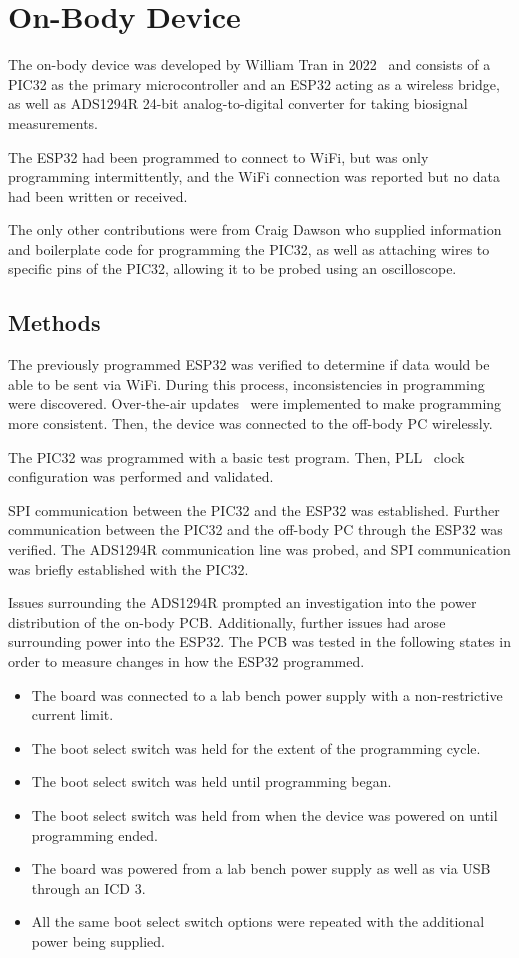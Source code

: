 \chapter{On-Body Device}
The on-body device was developed by William Tran in 2022~\cite{Tran:2022} and consists of
a PIC32 as the primary microcontroller and an ESP32 acting as a wireless bridge,
as well as ADS1294R 24-bit analog-to-digital converter for taking biosignal measurements.

The ESP32 had been programmed to connect to WiFi, but was only programming intermittently,
and the WiFi connection was reported but no data had been written or received.

The only other contributions were from Craig Dawson who supplied information and boilerplate code for programming the PIC32,
as well as attaching wires to specific pins of the PIC32, allowing it to be probed using an oscilloscope.


\section{Methods}
The previously programmed ESP32 was verified to determine if data would be able to be sent via WiFi.
During this process, inconsistencies in programming were discovered.
Over-the-air updates~\cite{Quadri:2014} were implemented to make programming more consistent.
Then, the device was connected to the off-body PC wirelessly.

The PIC32 was programmed with a basic test program.
Then, PLL~\cite{Maji:2016} clock configuration was performed and validated.

SPI communication between the PIC32 and the ESP32 was established.
Further communication between the PIC32 and the off-body PC through the ESP32 was verified.
The ADS1294R communication line was probed, and SPI communication was briefly established with the PIC32.

Issues surrounding the ADS1294R prompted an investigation into the power distribution of the on-body PCB.
Additionally, further issues had arose surrounding power into the ESP32.
The PCB was tested in the following states in order to measure changes in how the ESP32 programmed.

\begin{itemize}
        \item The board was connected to a lab bench power supply with a non-restrictive current limit.
        \item The boot select switch was held for the extent of the programming cycle.
        \item The boot select switch was held until programming began.
        \item The boot select switch was held from when the device was powered on until programming ended.
        \item The board was powered from a lab bench power supply as well as via USB through an ICD 3.
        \item All the same boot select switch options were repeated with the additional power being supplied.
\end{itemize}



